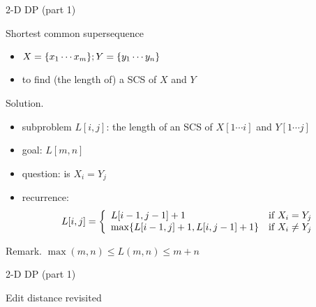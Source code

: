 \begin{frame}{2-D DP (part 1)}
  \begin{exampleblock}{Shortest common supersequence }
    \begin{itemize}
      \item $X = \{x_{1} \cdots x_{m}\}; Y = \{y_{1} \cdots y_{n}\}$
      \item to find (the length of) a SCS of $X$ and $Y$
    \end{itemize}
  \end{exampleblock}

  \begin{block}{Solution.}
    \begin{itemize}
      \item subproblem $L[i,j]$: the length of an SCS of $X[1 \cdots i]$ and $Y[1 \cdots j]$
      \item goal: $L[m,n]$
      \item question: is $X_{i} = Y_{j}$
      \item recurrence:
	\begin{displaymath}
	  L[i,j] = \left\{ \begin{array}{ll}
	    L[i-1, j-1] + 1 & \textrm{if $X_{i} = Y_{j}$}\\
	    \max \{L[i-1,j] + 1, L[i,j-1] + 1\} & \textrm{if $X_{i} \neq Y_{j}$}
	  \end{array} \right.
	\end{displaymath}
    \end{itemize}
  \end{block}

  \begin{alertblock}{Remark.}
    $\max(m,n) \le L(m,n) \le m+n$
  \end{alertblock}
\end{frame}
\begin{frame}{2-D DP (part 1)}
  \begin{exampleblock}{Edit distance revisited}

  \end{exampleblock}
\end{frame}
